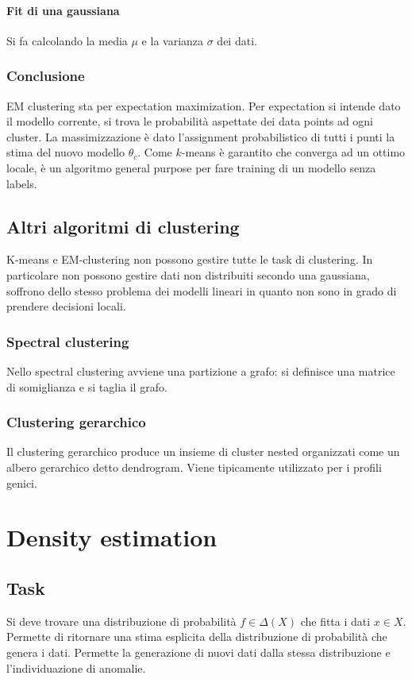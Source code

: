 		\paragraph{Fit di una gaussiana}
		Si fa calcolando la media $\mu$ e la varianza $\sigma$ dei dati.
		
		\subsubsection{Conclusione}
		EM clustering sta per expectation maximization.
		Per expectation si intende dato il modello corrente, si trova le probabilit\`a aspettate dei data points ad ogni cluster.
		La massimizzazione \`e dato l'assignment probabilistico di tutti i punti la stima del nuovo modello $\theta_c$.
		Come $k$-means \`e garantito che converga ad un ottimo locale, \`e un algoritmo general purpose per fare training di un modello senza labels.

	\subsection{Altri algoritmi di clustering}
	K-means e EM-clustering non possono gestire tutte le task di clustering.
	In particolare non possono gestire dati non distribuiti secondo una gaussiana, soffrono dello stesso problema dei modelli lineari in quanto non sono in grado di prendere decisioni locali.

	\subsubsection{Spectral clustering}
	Nello spectral clustering avviene una partizione a grafo: si definisce una matrice di somiglianza e si taglia il grafo.
	
	\subsubsection{Clustering gerarchico}
	Il clustering gerarchico produce un insieme di cluster nested organizzati come un albero gerarchico detto dendrogram.
	Viene tipicamente utilizzato per i profili genici.

\section{Density estimation}

	\subsection{Task}
	Si deve trovare una distribuzione di probabilit\`a $f\in \Delta(X)$ che fitta i dati $x\in X$.
	Permette di ritornare una stima esplicita della distribuzione di probabilit\`a che genera i dati.
	Permette la generazione di nuovi dati dalla stessa distribuzione e l'individuazione di anomalie.
	
